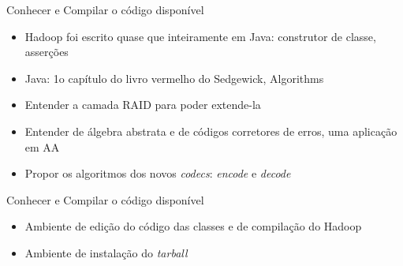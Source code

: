   \begin{frame}{Conhecer e Compilar o código disponível}
     \begin{itemize}
        \item<1-> Hadoop foi escrito quase que inteiramente em Java: construtor de classe, asserções
        \item<2-> Java: 1o capítulo do livro vermelho do Sedgewick, Algorithms
        \item<3-> Entender a camada RAID para poder extende-la
        \item<3-> Entender de álgebra abstrata e de códigos corretores de erros, uma aplicação em AA
        \item<4-> Propor os algoritmos dos novos \emph{codecs}: \emph{encode} e \emph{decode}
     \end{itemize}
  \end{frame}

  \begin{frame}{Conhecer e Compilar o código disponível}
     \begin{itemize}
        \item<1-> Ambiente de edição do código das classes e de compilação do Hadoop 
        \item<2-> Ambiente de instalação do \emph{tarball}
     \end{itemize}
  \end{frame}
